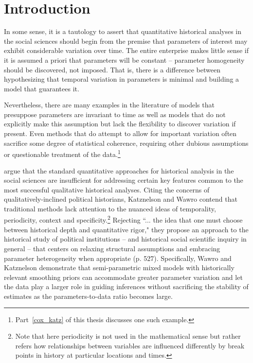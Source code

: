 \chapter{Introduction}
\label{introduction}

In some sense, it is a tautology to assert that quantitative historical analyses in the 
social sciences should begin from the premise that parameters of interest may exhibit 
considerable variation over time. The entire enterprise makes little sense if it is assumed 
a priori that parameters will be constant -- parameter homogeneity should be discovered, 
not imposed. That is, there is a difference between hypothesizing that temporal variation 
in parameters is minimal and building a model that guarantees it. 

Nevertheless, there are many examples in the literature of models that presuppose 
parameters are invariant to time as well as models that do not explicitly make this 
assumption but lack the flexibility to discover variation if present.  Even methods that 
do attempt to allow for important variation often sacrifice some degree of statistical 
coherence, requiring other dubious assumptions or questionable treatment of the data.\footnote{
Part~\ref{cox_katz} of this thesis discusses one such example.}

 argue that the standard quantitative approaches for historical 
analysis in the social sciences are insufficient for addressing certain key features common to 
the most successful qualitative historical analyses. Citing the concerns of qualitatively-inclined 
political historians, Katznelson and Wawro contend that traditional methods lack attention to 
the nuanced ideas of temporality, periodicity, context and specificity.\footnote{Note that here 
periodicity is not used in the mathematical sense but rather refers how relationships between 
variables are influenced differently by break points in history at particular locations and times.}  
Rejecting ``... the idea that one must choose between historical depth and quantitative rigor," 
they propose an approach to the historical study of political institutions -- and historical social 
scientific inquiry in general --  that centers on relaxing structural assumptions and embracing 
parameter heterogeneity when appropriate (p. 527). Specifically, Wawro and Katznelson 
demonstrate that semi-parametric mixed models with historically relevant smoothing priors 
can accommodate greater parameter variation and let the data play a larger role in guiding 
inferences without sacrificing the stability of estimates as the parameters-to-data ratio becomes 
large.  


